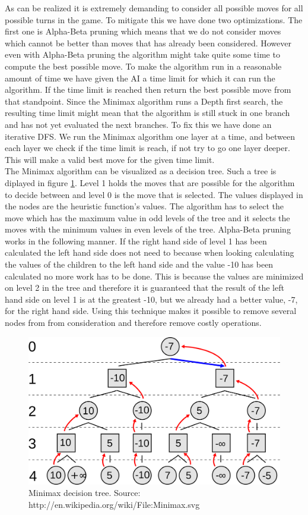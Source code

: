 \documentclass[a4paper]{article}
\begin{document}
As can be realized it is extremely demanding to consider all possible moves for all possible turns in the game. To mitigate this we have done two optimizations. The first one is Alpha-Beta pruning which means that we do not consider moves which cannot be better than moves that has already been considered. However even with Alpha-Beta pruning the algorithm might take quite some time to compute the best possible move. To make the algorithm run in a reasonable amount of time we have given the AI a time limit for which it can run the algorithm. If the time limit is reached then return the best possible move from that standpoint. Since the Minimax algorithm runs a Depth first search, the resulting time limit might mean that the algorithm is still stuck in one branch and has not yet evaluated the next branches. To fix this we have done an iterative DFS. We run the Minimax algorithm one layer at a time, and between each layer we check if the time limit is reach, if not try to go one layer deeper. This will make a valid best move for the given time limit. \\

The Minimax algorithm can be visualized as a decision tree. Such a tree is diplayed in figure \ref{minimax}. Level 1 holds the moves that are possible for the algorithm to decide between and level 0 is the move that is selected. The values displayed in the nodes are the heuristic function's values. The algorithm has to select the move which has the maximum value in odd levels of the tree and it selects the moves with the minimum values in even levels of the tree. Alpha-Beta pruning works in the following manner. If the right hand side of level 1 has been calculated the left hand side does not need to because when looking calculating the values of the children to the left hand side and the value -10 has been calculated no more work has to be done. This is because the values are minimized on level 2 in the tree and therefore it is guaranteed that the result of the left hand side on level 1 is at the greatest -10, but we already had a better value, -7, for the right hand side. Using this technique makes it possible to remove several nodes from from consideration and therefore remove costly operations.

\begin{figure}[h!]
  \centering
    \includegraphics[width=1\textwidth]{Minimax.png}
  \caption{Minimax decision tree. Source: http://en.wikipedia.org/wiki/File:Minimax.svg}
  \label{minimax}
\end{figure}
\end{document}
